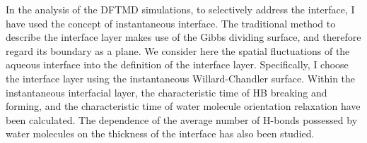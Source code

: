 In the analysis of the DFTMD simulations, to selectively address the interface, I 
have used the concept of instantaneous interface. 
The traditional method to describe the interface layer makes use of the Gibbs dividing surface, and therefore regard its boundary as a plane.
We consider here the spatial fluctuations of the aqueous interface into the definition of the interface layer. 
Specifically, I choose the interface layer using the instantaneous Willard-Chandler surface. 
Within the instantaneous interfacial layer, the characteristic time of HB breaking and forming, 
and the characteristic time of water molecule orientation relaxation have been calculated. 
The dependence of the average number of H-bonds possessed by water molecules 
on the thickness of the interface has also been studied. 

